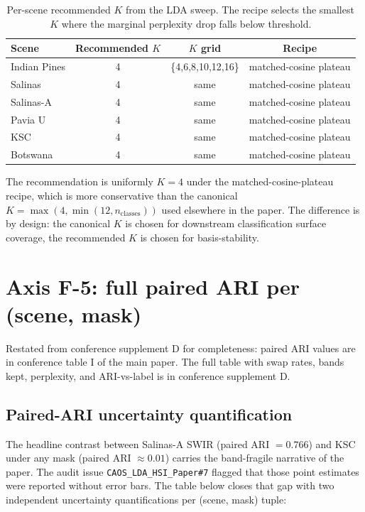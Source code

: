 \documentclass[11pt,a4paper]{article}
\begin{document}
\begin{table}[h]
\caption{Per-scene recommended $K$ from the LDA sweep. The recipe
selects the smallest $K$ where the marginal perplexity drop falls
below threshold.}
\label{tab:b4-recK}
\centering
\small
\begin{tabular}{l c c c}
\toprule
Scene & Recommended $K$ & $K$ grid & Recipe \\
\midrule
Indian Pines & 4 & \{4,6,8,10,12,16\} & matched-cosine plateau \\
Salinas      & 4 & same & matched-cosine plateau \\
Salinas-A    & 4 & same & matched-cosine plateau \\
Pavia U      & 4 & same & matched-cosine plateau \\
KSC          & 4 & same & matched-cosine plateau \\
Botswana     & 4 & same & matched-cosine plateau \\
\bottomrule
\end{tabular}
\end{table}

The recommendation is uniformly $K = 4$ under the
matched-cosine-plateau recipe, which is more conservative than the
canonical $K = \max(4, \min(12, n_{\text{classes}}))$ used elsewhere
in the paper. The difference is by design: the canonical $K$ is
chosen for downstream classification surface coverage, the
recommended $K$ is chosen for basis-stability.

\section{Axis F-5: full paired ARI per (scene, mask)}

Restated from conference supplement D for completeness: paired ARI
values are in conference table I of the main paper. The full table
with swap rates, bands kept, perplexity, and ARI-vs-label is in
conference supplement D.

\subsection{Paired-ARI uncertainty quantification}
\label{subsec:paired-ari-uncertainty}

The headline contrast between Salinas-A SWIR (paired ARI $= 0.766$)
and KSC under any mask (paired ARI $\approx 0.01$) carries the
band-fragile narrative of the paper. The audit issue
\texttt{CAOS\_LDA\_HSI\_Paper\#7} flagged that those point estimates
were reported without error bars. The table below closes that gap with
two independent uncertainty quantifications per (scene, mask) tuple:
\end{document}

